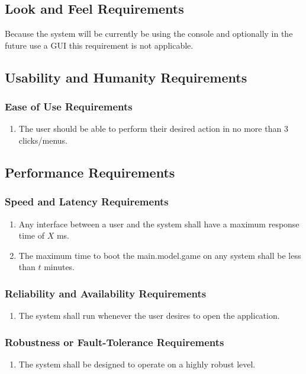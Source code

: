 \documentclass[12pt, titlepage]{article}
\begin{document}
\subsection{Look and Feel Requirements}
    Because the system will be currently be using the console and optionally in the future use a GUI this requirement is not applicable. 
\subsection{Usability and Humanity Requirements}
    \subsubsection{Ease of Use Requirements}
        \label{ssub:ease_of_use_requirements}
        \begin{enumerate}[label=UH\arabic*.]
            \item The user should be able to perform their desired action in no more than 3 clicks/menus.
        \end{enumerate}
        

\subsection{Performance Requirements}
    \subsubsection{Speed and Latency Requirements}
    \begin{enumerate}[label=PR\arabic*.]
        \item Any interface between a user and the system shall have a maximum response time of $X$ ms.
        \item The maximum time to boot the main.model.game on any system shall be less than $t$ minutes.
    \end{enumerate}
    \subsubsection{Reliability and Availability Requirements}
    \begin{enumerate}[label=PR\arabic*.]
        \item The system shall run whenever the user desires to open the application.  
    \end{enumerate}
    \subsubsection{Robustness or Fault-Tolerance Requirements}
    \begin{enumerate}[label=PR\arabic*.]
        \item The system shall be designed to operate on a highly robust level.
    \end{enumerate}
\end{document}
